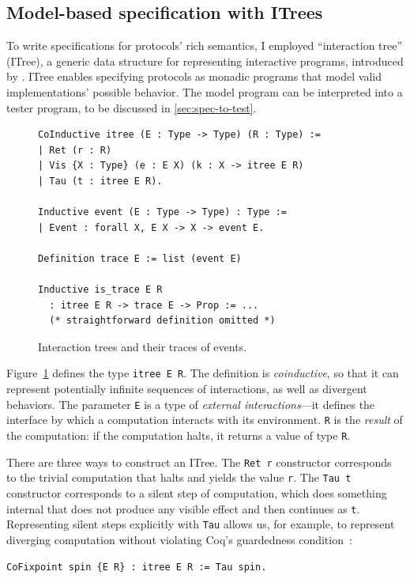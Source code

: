 \documentclass[12pt,oneside]{amsbook}
\newcommand{\ilc}[1]{\lstinline[style=customcoq]{#1}}
\numberwithin{section}{chapter}
\numberwithin{figure}{chapter}
\numberwithin{equation}{chapter}
\begin{document}
\subsection{Model-based specification with ITrees}
To write specifications for protocols' rich semantics, I employed ``interaction
tree'' (ITree), a generic data structure for representing interactive programs,
introduced by \textcite{itree}.  ITree enables specifying protocols as monadic
programs that model valid implementations' possible behavior.  The model program
can be interpreted into a tester program, to be discussed in
\autoref{sec:spec-to-test}.

\begin{figure}
  \begin{lstlisting}[style=customcoq]
CoInductive itree (E : Type -> Type) (R : Type) :=
| Ret (r : R)
| Vis {X : Type} (e : E X) (k : X -> itree E R)
| Tau (t : itree E R).

Inductive event (E : Type -> Type) : Type :=
| Event : forall X, E X -> X -> event E.

Definition trace E := list (event E)

Inductive is_trace E R
  : itree E R -> trace E -> Prop := ...
  (* straightforward definition omitted *)
 \end{lstlisting}
  \caption{Interaction trees and their traces of events.}
  \label{fig:itrees}
\end{figure}

Figure~\ref{fig:itrees} defines the type \ilc{itree E R}.  The definition is
\textit{coinductive}, so that it can represent potentially infinite sequences of
interactions, as well as divergent behaviors.  The parameter \ilc{E} is a type
of \textit{external interactions}---it defines the interface by which a
computation interacts with its environment.  \ilc{R} is the \textit{result} of
the computation: if the computation halts, it returns a value of type \ilc{R}.

There are three ways to construct an ITree. The \ilc{Ret r} constructor
corresponds to the trivial computation that halts and yields the value
\ilc{r}. The \ilc{Tau t} constructor corresponds to a silent step of
computation, which does something internal that does not produce any visible
effect and then continues as \ilc{t}.  Representing silent steps explicitly with
\ilc{Tau} allows us, for example, to represent diverging computation without
violating Coq's guardedness condition~\cite{coinduction}:

\begin{lstlisting}[style=customcoq]
CoFixpoint spin {E R} : itree E R := Tau spin.
\end{lstlisting}
\end{document}
